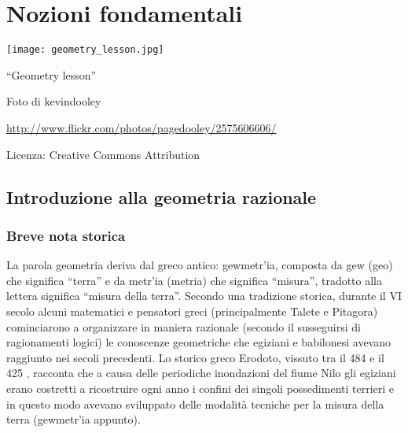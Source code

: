 \chapter{Nozioni fondamentali}

\texttt{[image: geometry\_lesson.jpg]}
  \begin{center}
    {\large ``Geometry lesson''}\par
    Foto di kevindooley\par
    \url{http://www.flickr.com/photos/pagedooley/2575606606/}\par
    Licenza: Creative Commons Attribution\par
  \end{center}
\newpage

\section{Introduzione alla geometria razionale}
\subsection{Breve nota storica}
La parola geometria deriva dal greco antico: \textgreek{gewmetr'ia}, composta da \textgreek{gew} (geo) che significa ``terra'' e da \textgreek{metr'ia} (metria) che significa ``misura'', tradotto alla lettera significa ``misura della terra''. Secondo una tradizione storica, durante il VI secolo \aC{} alcuni matematici e pensatori greci (principalmente Talete e Pitagora) cominciarono a organizzare in maniera razionale (secondo il susseguirsi di ragionamenti logici) le conoscenze geometriche che egiziani e babilonesi avevano raggiunto nei secoli precedenti. Lo storico greco Erodoto, vissuto tra il 484 \aC{} e il 425 \aC, racconta che a causa delle periodiche inondazioni del fiume Nilo gli egiziani erano costretti a ricostruire ogni anno i confini dei singoli possedimenti terrieri e in questo modo avevano sviluppato delle modalità tecniche per la misura della terra (\textgreek{gewmetr'ia} appunto).

